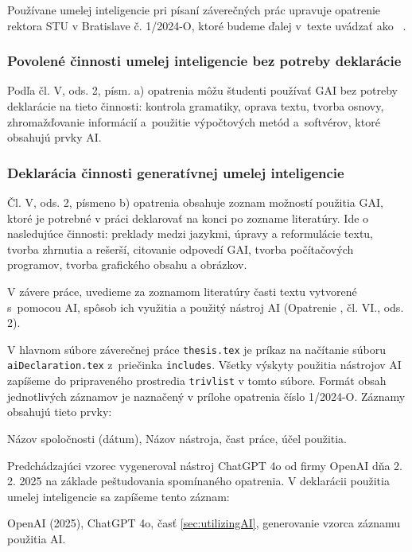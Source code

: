 Používane umelej inteligencie pri písaní záverečných prác
upravuje opatrenie rektora STU v Bratislave č. 1/2024-O, ktoré budeme ďalej v~texte uvádzať ako ~\cite{opatrenie12024}.

\subsubsection*{Povolené činnosti umelej inteligencie bez potreby deklarácie}
Podľa čl. V, ods. 2, písm. a) opatrenia môžu študenti používať GAI bez potreby deklarácie na tieto činnosti: kontrola gramatiky, oprava textu, tvorba osnovy, zhromažďovanie informácií a~použitie výpočtových metód a~softvérov, ktoré obsahujú prvky AI.

\subsubsection*{Deklarácia činnosti generatívnej umelej inteligencie}
Čl. V, ods. 2, písmeno b) opatrenia obsahuje zoznam možností použitia GAI, ktoré je potrebné v práci deklarovať na konci po zozname literatúry.
Ide o nasledujúce činnosti: preklady medzi jazykmi, úpravy a reformulácie textu, tvorba zhrnutia a rešerší, citovanie odpovedí GAI, tvorba počítačových programov, tvorba grafického obsahu a obrázkov.

V závere práce, uvedieme za zoznamom literatúry
časti textu vytvorené s~pomocou AI, spôsob ich využitia a použitý nástroj AI (Opatrenie \cite{opatrenie12024}, čl. VI., ods. 2).

V hlavnom súbore záverečnej práce \verb|thesis.tex| je príkaz na načítanie súboru \verb|aiDeclaration.tex| z~priečinka \verb|includes|.
Všetky výskyty použitia nástrojov AI zapíšeme do pripraveného prostredia \verb|trivlist| v tomto súbore.
Formát obsah jednotlivých záznamov je naznačený v prílohe opatrenia číslo 1/2024-O.
Záznamy obsahujú tieto prvky:
\begin{trivlist}
  \item Názov spoločnosti (dátum), Názov nástroja, čast práce, účel použitia.
\end{trivlist}

Predchádzajúci vzorec vygeneroval nástroj ChatGPT 4o od firmy OpenAI dňa 2. 2. 2025 na základe peštudovania spomínaného opatrenia. V deklarácii použitia umelej inteligencie sa zapíšeme tento záznam:
\begin{trivlist}
  \item OpenAI (2025), ChatGPT 4o, časť \ref{sec:utilizingAI}, generovanie vzorca záznamu použitia AI.
\end{trivlist}


